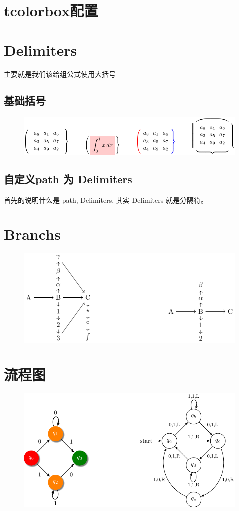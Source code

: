 \documentclass[12pt]{article}
\begin{document}
\section{tcolorbox配置}


\section{Delimiters}
主要就是我们该给组公式使用大括号 

\subsection{基础括号}
\begin{figure}[!htb]
    \centering
    \includegraphics[scale=1]{./pics/brace.pdf}
\end{figure}



\subsection{自定义path 为 Delimiters}
首先的说明什么是 {\ttfamily path, Delimiters},
其实 {\ttfamily Delimiters} 就是分隔符。


\clearpage
\section{Branchs}
\begin{figure}[!htb]
    \centering
    \includegraphics[scale=1]{./pics/branch.pdf}
\end{figure}


\section{流程图}
\begin{figure}[!htb]
    \centering
    \includegraphics[scale=1]{./pics/process.pdf}
\end{figure}
\end{document}
